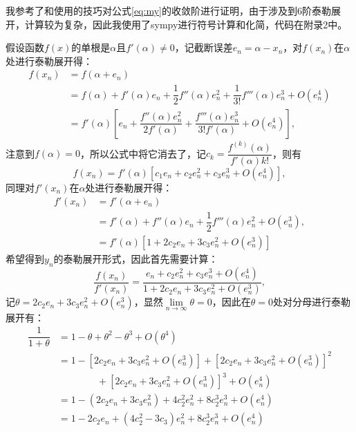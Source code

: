 我参考了\cite{kou2006modified}和\cite{eftekhari2014new}使用的技巧对公式\ref{eq:my}的收敛阶进行证明，由于涉及到6阶泰勒展开，计算较为复杂，因此我使用了sympy进行符号计算和化简，代码在附录2中。

假设函数$f(x)$的单根是$\alpha$且$f'(\alpha)\neq 0$，记截断误差$e_n = \alpha - x_n$，对$f(x_n)$在$\alpha$处进行泰勒展开得：
\begin{equation}
    \label{eq:fx-taylor}
    \begin{aligned}
        f(x_n) &= f(\alpha + e_n) \\
        &= f(\alpha) + f'(\alpha)e_n + \dfrac{1}{2}f''(\alpha)e_n^2+\dfrac{1}{3!}f'''(\alpha)e_n^3+O(e_n^4) \\
        &= f'(\alpha)\left[e_n + \dfrac{f''(\alpha)e_n^2}{2f'(\alpha)}+\dfrac{f'''(\alpha)e_n^3}{3!f'(\alpha)} + O(e_n^4) \right],
    \end{aligned}
\end{equation}
注意到$f(\alpha)=0$，所以公式中将它消去了，记$c_k=\dfrac{f^{(k)}(\alpha)}{f'(\alpha)k!}$，则有
\begin{equation}
    f(x_n) = f'(\alpha)\left[c_1e_n + c_2e_n^2 + c_3e_n^3 + O(e_n^4)\right],
\end{equation}
同理对$f'(x_n)$在$\alpha$处进行泰勒展开得：
\begin{equation}
    \label{eq:dx}
    \begin{aligned}
        f'(x_n) &= f'(\alpha + e_n)\\
        &= f'(\alpha) + f''(\alpha)e_n + \dfrac{1}{2}f'''(\alpha)e_n^2 + O(e_n^3), \\
        &=f'(\alpha) [1 + 2c_2e_n + 3c_3e_n^2 + O(e_n^3)]
    \end{aligned}
\end{equation}
希望得到$y_n$的泰勒展开形式，因此首先需要计算：
\begin{equation}
    \label{eq:fx-div-dx}
    \dfrac{f(x_n)}{f'(x_n)} = \dfrac{e_n+c_2e_n^2 + c_3e_n^3 + O(e_n^4)}{1 + 2c_2e_n + 3c_3e_n^2 + O(e_n^3)},
\end{equation}
记$\theta = 2c_2e_n + 3c_3e_n^2 + O(e_n^3)$，显然$\lim\limits_{n\to \infty}\theta = 0$，因此在$\theta = 0$处对分母进行泰勒展开有：
\begin{equation}
    \label{eq:fenmu-taylor}
    \begin{aligned}
        \dfrac{1}{1+\theta} &= 1 - \theta + \theta^2 - \theta^3 + O(\theta^4) \\
        &= 1 - [2c_2e_n + 3c_3e_n^2 + O(e_n^3)] + [2c_2e_n + 3c_3e_n^2 + O(e_n^3)]^2 \\
        &\qquad\qquad + [2c_2e_n + 3c_3e_n^2 + O(e_n^3)]^3 + O(e_n^4)\\
        &= 1 - (2c_2e_n + 3c_3e_n^2) + 4c_2^2e_n^2 + 8c_2^3e_n^3 + O(e_n^4)\\
        &= 1 - 2c_2e_n + (4c_2^2 - 3c_3)e_n^2 + 8c_2^3e_n^3 + O(e_n^4)
    \end{aligned}
\end{equation}
